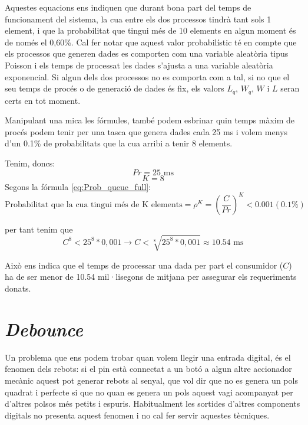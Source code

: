 Aquestes equacions ens indiquen que durant bona part del temps de funcionament del sistema, la cua entre els dos processos tindrà tant sols 1 element, i que la probabilitat que tingui més de 10 elements en algun moment és de només el 0,60\%.
Cal fer notar que aquest valor probabilístic té en compte que els processos que generen dades es comporten com una variable aleatòria tipus Poisson i els temps de processat les dades s'ajusta a una variable aleatòria exponencial. 
Si algun dels dos processos no es comporta com a tal, si no que el seu temps de procés o de generació de dades és fix, els valors $L_q$, $W_q$, $W$ i $L$ seran certs en tot moment.

Manipulant una mica les fórmules, també podem esbrinar quin temps màxim de procés podem tenir per una tasca que genera dades cada 25 ms i volem menys d'un 0.1\% de probabilitats que la cua arribi a tenir 8 elements.

Tenim, doncs:
\begin{equation*}
 Pr = 25 \text{ ms}
\end{equation*}
\begin{equation*}
 K = 8
\end{equation*}
Segons la fórmula \ref{eq:Prob_queue_full}:
\begin{equation*}
 \text{Probabilitat que la cua tingui més de K elements} = \rho^K =  (\frac{C}{Pr})^K < 0.001 (0.1\%)
\end{equation*}

per tant tenim que
\begin{equation*}
C^8 < 25^8*0,001  \rightarrow C < \sqrt[8]{25^8 * 0,001} \approx 10.54 \text{ ms}
\end{equation*}

Això ens indica que el temps de processar una dada per part el consumidor ($C$) ha de ser menor de 10.54 mil·lisegons de mitjana per assegurar els requeriments donats.


\section{\em Debounce}

Un problema que ens podem trobar quan volem llegir una entrada digital, és el fenomen dels rebots: si el pin està connectat a un botó a algun altre accionador mecànic aquest pot generar rebots al senyal, que vol dir que no es genera un pols quadrat i perfecte si que no quan es genera un pols aquest vagi acompanyat per d'altres polsos més petits i espuris. Habitualment les sortides d'altres components digitals no presenta aquest fenomen i no cal fer servir aquestes tècniques.

